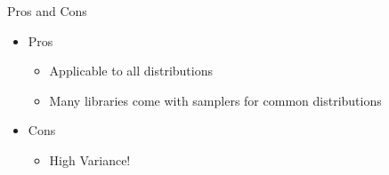\documentclass[14pt]{beamer}
\begin{document}
%
%
%
%
%

\begin{frame}{Pros and Cons}
\begin{itemize}
\item Pros
\begin{itemize}
\item Applicable to all distributions
\item Many libraries come with samplers for common distributions
\end{itemize}
\pause
\item Cons
\begin{itemize}
\item High Variance!
\end{itemize}
\end{itemize}
\end{frame}
\end{document}

